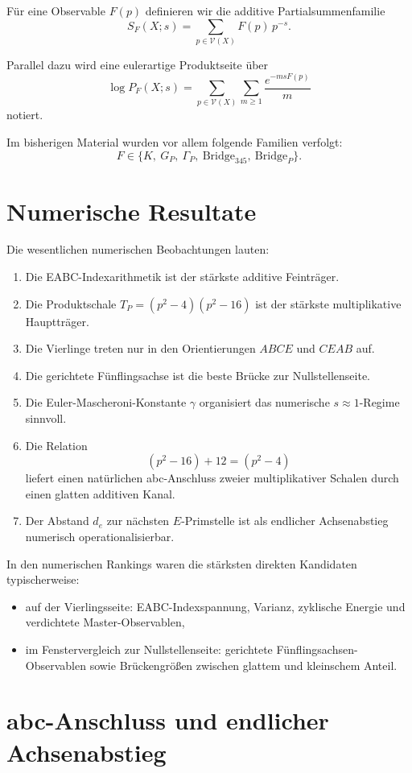 \documentclass[11pt,a4paper]{article}
\theoremstyle{definition}
\begin{document}
Für eine Observable $F(p)$ definieren wir die additive Partialsummenfamilie
\[
S_F(X;s)=\sum_{p\in\mathcal V(X)} F(p)\,p^{-s}.
\]

Parallel dazu wird eine eulerartige Produktseite über
\[
\log P_F(X;s)=\sum_{p\in\mathcal V(X)}\sum_{m\ge 1}\frac{e^{-msF(p)}}{m}
\]
notiert.

Im bisherigen Material wurden vor allem folgende Familien verfolgt:
\[
F\in\{K,\ G_P,\ \Gamma_P,\ \mathrm{Bridge}_{345},\ \mathrm{Bridge}_{P}\}.
\]

\section{Numerische Resultate}

Die wesentlichen numerischen Beobachtungen lauten:
\begin{enumerate}[leftmargin=1.8em]
\item Die EABC-Indexarithmetik ist der stärkste additive Feinträger.
\item Die Produktschale $T_P=(p^2-4)(p^2-16)$ ist der stärkste multiplikative Hauptträger.
\item Die Vierlinge treten nur in den Orientierungen $ABCE$ und $CEAB$ auf.
\item Die gerichtete Fünflingsachse ist die beste Brücke zur Nullstellenseite.
\item Die Euler-Mascheroni-Konstante $\gamma$ organisiert das numerische $s\approx 1$-Regime sinnvoll.
\item Die Relation
\[
(p^2-16)+12=(p^2-4)
\]
liefert einen natürlichen abc-Anschluss zweier multiplikativer Schalen durch einen glatten additiven Kanal.
\item Der Abstand $d_e$ zur nächsten $E$-Primstelle ist als endlicher Achsenabstieg numerisch operationalisierbar.
\end{enumerate}

In den numerischen Rankings waren die stärksten direkten Kandidaten typischerweise:
\begin{itemize}[leftmargin=1.5em]
\item auf der Vierlingsseite: EABC-Indexspannung, Varianz, zyklische Energie und verdichtete Master-Observablen,
\item im Fenstervergleich zur Nullstellenseite: gerichtete Fünflingsachsen-Observablen sowie Brückengrößen zwischen glattem und kleinschem Anteil.
\end{itemize}

\section{abc-Anschluss und endlicher Achsenabstieg}
\end{document}
